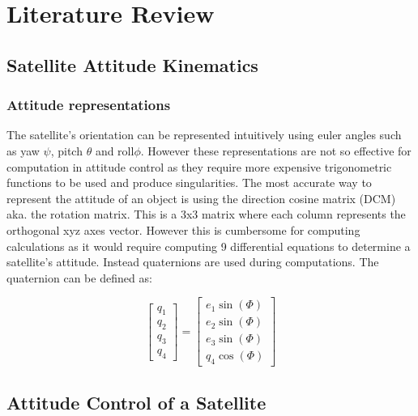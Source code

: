 \section{Literature Review}

\subsection{Satellite Attitude Kinematics}

\subsubsection{Attitude representations}
The satellite's orientation can be represented intuitively using euler angles such as yaw $\psi$, pitch $\theta$ and roll$\phi$. However these representations are not so effective for computation in attitude control as they require more expensive trigonometric functions to be used and produce singularities. The most accurate way to represent the attitude of an object is using the direction cosine matrix (DCM) aka. the rotation matrix. This is a 3x3 matrix where each column represents the orthogonal xyz axes vector. However this is cumbersome for computing calculations as it would require computing 9 differential equations to determine a satellite's attitude. Instead quaternions are used during computations. The quaternion can be defined as: 

\begin{equation}
    \begin{bmatrix}
        q_{1} \\ q_{2} \\ q_{3} \\ q_{4}
    \end{bmatrix}
    =
    \begin{bmatrix}
        e_{1}\sin(\Phi) \\ e_{2}\sin(\Phi) \\ e_{3}\sin(\Phi) \\ q_{4}\cos(\Phi)
    \end{bmatrix}
\end{equation}



\subsection{Attitude Control of a Satellite}
